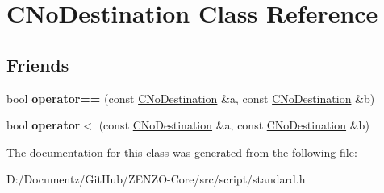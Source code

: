 \hypertarget{class_c_no_destination}{}\section{C\+No\+Destination Class Reference}
\label{class_c_no_destination}
\subsection*{Friends}
\begin{DoxyCompactItemize}
\item 
\mbox{\label{class_c_no_destination_a1b82081ed666bc8b1ba11d90122960b7}} 
bool {\bfseries operator==} (const \mbox{\hyperlink{class_c_no_destination}{C\+No\+Destination}} \&a, const \mbox{\hyperlink{class_c_no_destination}{C\+No\+Destination}} \&b)
\item 
\mbox{\label{class_c_no_destination_a0c469c10d44b10452fe9bfde8952713b}} 
bool {\bfseries operator$<$} (const \mbox{\hyperlink{class_c_no_destination}{C\+No\+Destination}} \&a, const \mbox{\hyperlink{class_c_no_destination}{C\+No\+Destination}} \&b)
\end{DoxyCompactItemize}


The documentation for this class was generated from the following file\+:\begin{DoxyCompactItemize}
\item 
D\+:/\+Documentz/\+Git\+Hub/\+Z\+E\+N\+Z\+O-\/\+Core/src/script/standard.\+h\end{DoxyCompactItemize}
